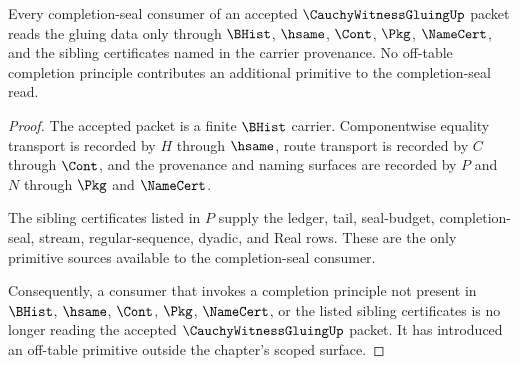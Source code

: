 \begin{theorem}
\label{thm:cauchy-witness-gluing-completion-seal-scope}
Every completion-seal consumer of an accepted $\CauchyWitnessGluingUp$ packet reads the gluing data only through $\BHist$, $\hsame$, $\Cont$, $\Pkg$, $\NameCert$, and the sibling certificates named in the carrier provenance. No off-table completion principle contributes an additional primitive to the completion-seal read.
\end{theorem}
\begin{proof}
The accepted packet is a finite $\BHist$ carrier. Componentwise equality transport is recorded by $H$ through $\hsame$, route transport is recorded by $C$ through $\Cont$, and the provenance and naming surfaces are recorded by $P$ and $N$ through $\Pkg$ and $\NameCert$.

The sibling certificates listed in $P$ supply the ledger, tail, seal-budget, completion-seal, stream, regular-sequence, dyadic, and Real rows. These are the only primitive sources available to the completion-seal consumer.

Consequently, a consumer that invokes a completion principle not present in $\BHist$, $\hsame$, $\Cont$, $\Pkg$, $\NameCert$, or the listed sibling certificates is no longer reading the accepted $\CauchyWitnessGluingUp$ packet. It has introduced an off-table primitive outside the chapter's scoped surface.
\end{proof}

